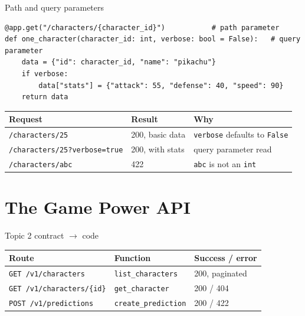 \documentclass[aspectratio=169,10pt]{beamer}
\begin{document}
\begin{frame}[fragile]{Path and query parameters}
\begin{lstlisting}
@app.get("/characters/{character_id}")           # path parameter
def one_character(character_id: int, verbose: bool = False):   # query parameter
    data = {"id": character_id, "name": "pikachu"}
    if verbose:
        data["stats"] = {"attack": 55, "defense": 40, "speed": 90}
    return data
\end{lstlisting}
\vspace{0.1cm}
\begin{center}
\begin{tabular}{lll}
\toprule
\textbf{Request} & \textbf{Result} & \textbf{Why} \\
\midrule
\texttt{/characters/25} & 200, basic data & \texttt{verbose} defaults to \texttt{False} \\
\texttt{/characters/25?verbose=true} & 200, with stats & query parameter read \\
\texttt{/characters/abc} & \alert{422} & \texttt{abc} is not an \texttt{int} \\
\bottomrule
\end{tabular}
\end{center}
\end{frame}

\section{The Game Power API}

\begin{frame}{Topic 2 contract $\rightarrow$ code}
\begin{center}
\begin{tabular}{lll}
\toprule
\textbf{Route} & \textbf{Function} & \textbf{Success / error} \\
\midrule
\texttt{GET /v1/characters} & \texttt{list\_characters} & 200, paginated \\
\texttt{GET /v1/characters/\{id\}} & \texttt{get\_character} & 200 / 404 \\
\texttt{POST /v1/predictions} & \texttt{create\_prediction} & 200 / 422 \\
\bottomrule
\end{tabular}
\end{center}
\vspace{0.2cm}
\begin{center}
\end{center}
\end{frame}
\end{document}
